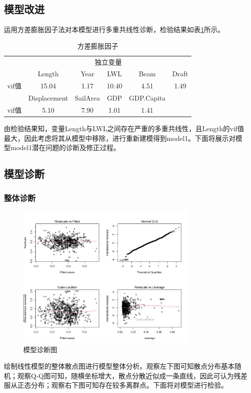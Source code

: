 \documentclass[a4paper,12pt,onecolumn,oneside]{article}
\begin{document}
\subsection{模型改进}
运用方差膨胀因子法对本模型进行多重共线性诊断，检验结果如表\ref{tab:vif2}所示。\par 
\begin{table}[htbp]
	\centering
	\caption{方差膨胀因子}\vspace{0.5\baselineskip}
	\begin{tabular}{c|ccccc}
		\toprule
		& \multicolumn{5}{c}{独立变量} \\
		\cmidrule{2-6}          & Length & Year  & LWL   & Beam  & Draft \\
		\hline
		vif值  & 15.04 & 1.17  & 10.40 & 4.51  & 1.49 \\\midrule
		& Displacement & SailArea & GDP   & GDP.Capita &  \\\hline 
		vif值  & 5.10  & 7.90  & 1.01  & 1.41  &  \\
		\bottomrule
	\end{tabular}%
	\label{tab:vif2}%
\end{table}%
由检验结果知，变量Length与LWL之间存在严重的多重共线性，且Length的vif值最大，因此考虑将其从模型中移除，进行重新建模得到model1。下面将展示对模型model1潜在问题的诊断及修正过程。
\subsection{模型诊断}
\subsubsection{整体诊断}
	\begin{figure}[H]
	\centering
	\includegraphics[width=0.8\textwidth]{res/zhenduan.png}
	\caption{模型诊断图}
	\label{fig:zhengti}
\end{figure}
绘制线性模型的整体散点图进行模型整体分析。观察左下图可知散点分布基本随机；观察Q-Q图可知，随横坐标增大，散点分散近似成一条直线，因此可认为残差服从正态分布；观察右下图可知存在较多离群点。下面将对模型进行检验。
\end{document}

